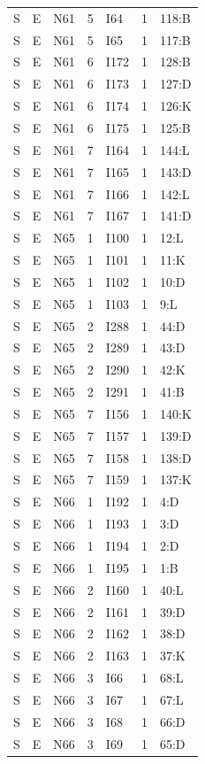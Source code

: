 {\begin{longtable}{lllrlrp{.35\linewidth}}
S & E & N61 & 5 & I64 & 1 & 118:B \\
S & E & N61 & 5 & I65 & 1 & 117:B \\
S & E & N61 & 6 & I172 & 1 & 128:B \\
S & E & N61 & 6 & I173 & 1 & 127:D \\
S & E & N61 & 6 & I174 & 1 & 126:K \\
S & E & N61 & 6 & I175 & 1 & 125:B \\
S & E & N61 & 7 & I164 & 1 & 144:L \\
S & E & N61 & 7 & I165 & 1 & 143:D \\
S & E & N61 & 7 & I166 & 1 & 142:L \\
S & E & N61 & 7 & I167 & 1 & 141:D \\
S & E & N65 & 1 & I100 & 1 & 12:L \\
S & E & N65 & 1 & I101 & 1 & 11:K \\
S & E & N65 & 1 & I102 & 1 & 10:D \\
S & E & N65 & 1 & I103 & 1 & 9:L \\
S & E & N65 & 2 & I288 & 1 & 44:D \\
S & E & N65 & 2 & I289 & 1 & 43:D \\
S & E & N65 & 2 & I290 & 1 & 42:K \\
S & E & N65 & 2 & I291 & 1 & 41:B \\
S & E & N65 & 7 & I156 & 1 & 140:K \\
S & E & N65 & 7 & I157 & 1 & 139:D \\
S & E & N65 & 7 & I158 & 1 & 138:D \\
S & E & N65 & 7 & I159 & 1 & 137:K \\
S & E & N66 & 1 & I192 & 1 & 4:D \\
S & E & N66 & 1 & I193 & 1 & 3:D \\
S & E & N66 & 1 & I194 & 1 & 2:D \\
S & E & N66 & 1 & I195 & 1 & 1:B \\
S & E & N66 & 2 & I160 & 1 & 40:L \\
S & E & N66 & 2 & I161 & 1 & 39:D \\
S & E & N66 & 2 & I162 & 1 & 38:D \\
S & E & N66 & 2 & I163 & 1 & 37:K \\
S & E & N66 & 3 & I66 & 1 & 68:L \\
S & E & N66 & 3 & I67 & 1 & 67:L \\
S & E & N66 & 3 & I68 & 1 & 66:D \\
S & E & N66 & 3 & I69 & 1 & 65:D \\

\end{longtable}}
